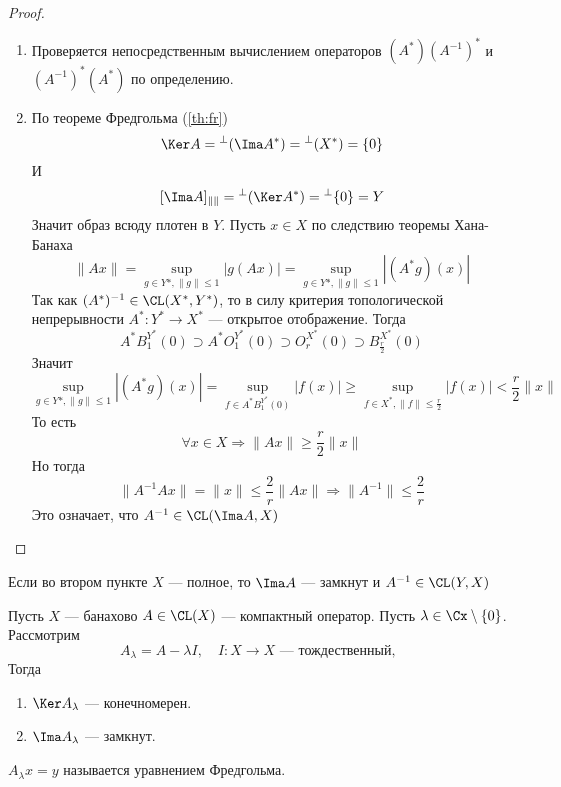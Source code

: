 \begin{proof}
	\hfil
	\begin{enumerate}
		\item Проверяется непосредственным вычислением операторов $(A^*)(A^{-1})^*$ и $(A^{-1})^*(A^*)$ по определению. 
		\item По теореме Фредгольма (\ref{th:fr})
		$$
		\Ker A = {}^\perp(\Ima A^*) = {}^\perp (X^*) = \{0\}
		$$
		И
		$$
		[\Ima A]_{\|\|} = {}^\perp(\Ker A^*) = {}^\perp\{0\}= Y
		$$
		Значит образ всюду плотен в $Y$. Пусть $x \in X$ по следствию теоремы Хана-Банаха
		$$
		\|Ax\| = \sup\limits_{g \in Y*, \|g\| \leq 1}|g(Ax)| = \sup\limits_{g \in Y*, \|g\| \leq 1} |(A^*g)(x)|
		$$
		Так как $(A^*)^{-1} \in \CL(X^*, Y^*)$, то в силу критерия топологической непрерывности $A^* \colon Y^* \to X^*$ --- открытое отображение. Тогда 
		$$
		A^*B_1^{Y^*}(0) \supset A^*O_1^{Y^*}(0) \supset O_r^{X^*}(0) \supset  B_\frac{r}{2}^{X^*}(0)
		$$
		Значит
		$$
		\sup\limits_{g \in Y*, \|g\| \leq 1} |(A^*g)(x)| = \sup\limits_{f \in A^*B_1^{Y^*}(0)} |f(x)| \geq \sup\limits_{f \in X^*, \|f\| \leq \frac{r}{2}} |f(x)| < \frac{r}{2}\|x\|
		$$
		То есть
		$$
		\forall x \in X \Rightarrow \|Ax\| \geq \frac{r}{2}\|x\|
		$$
		Но тогда
		$$
		\|A^{-1}Ax\| = \|x\| \leq \frac{2}{r}\|Ax\| \Rightarrow \|A^{-1}\| \leq \frac{2}{r}
		$$
		Это означает, что $A^{-1} \in \CL(\Ima A, X)$
	\end{enumerate}
\end{proof}
\begin{remark}
	Если во втором пункте $X$ --- полное, то $\Ima A$ --- замкнут и $A^{-1} \in \CL(Y,X)$
\end{remark}
\begin{theorem}
	\hfill
	
	Пусть $X$ --- банахово $A\in \CL(X)$ --- компактный оператор. Пусть $\lambda \in \Cx \setminus \{0\}$. Рассмотрим
	$$
	A_\lambda = A - \lambda I, \quad I \colon X \to X \text{ --- тождественный, } 
	$$
	Тогда
	\begin{enumerate}
		\item $\Ker A_\lambda$ --- конечномерен. 
		\item $\Ima A_\lambda$ --- замкнут. 
	\end{enumerate}

\end{theorem}
\begin{remark}
	$A_\lambda x = y$ называется уравнением Фредгольма. 
\end{remark}
